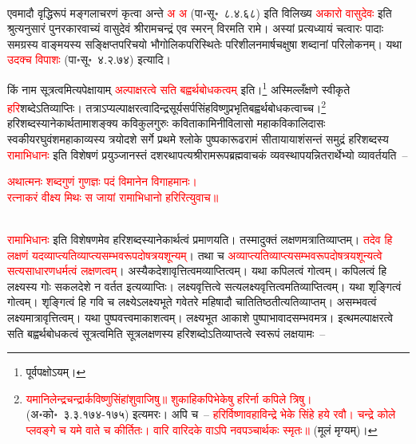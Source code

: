 \\
\begin{sloppypar}\justifying\noindent एवमादौ वृद्धिरूपं मङ्गलाचरणं कृत्वा अन्ते \textcolor{red}{अ अ} (पा॰सू॰~८.४.६८) इति विलिख्य \textcolor{red}{अकारो वासुदेवः} इति श्रुत्यनुसारं पुनरकार\-वाच्यं वासुदेवं श्रीरामचन्द्रं एव स्मरन् विरमति रामे। अस्यां प्रत्यध्यायं चत्वारः पादाः समग्रस्य वाङ्मयस्य सङ्क्षिप्त\-परिचयो भौगोलिक\-परिस्थितेः परिशीलनमार्ष\-चक्षुषा शब्दानां परिलोकनम्। यथा \textcolor{red}{उदक्च विपाशः} (पा॰सू॰~४.२.७४) इत्यादि।\end{sloppypar}
\begin{sloppypar}\justifying\noindent\hspace{10mm} किं नाम सूत्रत्वमित्यपेक्षायाम् \textcolor{red}{अल्पाक्षरत्वे सति बह्वर्थ\-बोधकत्वम्} इति।\footnote{पूर्वपक्षोऽयम्।} अस्मिल्लँक्षणे स्वीकृते \textcolor{red}{हरि}\-शब्देऽति\-व्याप्तिः। तत्राऽप्यल्पाक्षर\-त्वादिन्द्र\-सूर्य\-सर्प\-सिंह\-विष्णु\-प्रभृति\-बह्वर्थ\-बोधकत्वाच्च।\footnote{\textcolor{red}{यमानिलेन्द्र\-चन्द्रार्क\-विष्णु\-सिंहांशु\-वाजिषु॥ शुकाहि\-कपि\-भेकेषु हरिर्ना कपिले त्रिषु।} (अ॰को॰~३.३.१७४-१७५) इत्यमरः। अपि च~– \textcolor{red}{हरिर्विष्णावहाविन्द्रे भेके सिंहे हये रवौ। चन्द्रे कोले प्लवङ्गे च यमे वाते च कीर्तितः। वारि वारिदके वाऽपि नवपञ्चार्थकः स्मृतः॥} (मूलं मृग्यम्)।} हरि\-शब्दस्यानेकार्थ\-तामाशङ्क्य कवि\-कुल\-गुरुः कविता\-कामिनी\-विलासो महा\-कवि\-कालिदासः स्वकीय\-रघुवंश\-महा\-काव्यस्य त्रयोदशे सर्गे प्रथमे श्लोके पुष्पकारूढ\-रामं सीतायायाशंसन्तं समुद्रं हरि\-शब्दस्य \textcolor{red}{रामाभिधानः} इति विशेषणं प्रयुञ्जानस्तं दशरथापत्य\-श्रीराम\-रूप\-ब्रह्म\-वाचकं व्यवस्थापयन्नितरार्थेभ्यो व्यावर्तयति~–\end{sloppypar}
\centering\textcolor{red}{अथात्मनः शब्दगुणं गुणज्ञः पदं विमानेन विगाहमानः।\nopagebreak\\
रत्नाकरं वीक्ष्य मिथः स जायां रामाभिधानो हरिरित्युवाच॥}\nopagebreak\\
\\
\begin{sloppypar}\justifying\noindent \textcolor{red}{रामाभिधानः} इति विशेषणमेव हरि\-शब्दस्यानेकार्थत्वं प्रमाणयति। तस्मादुक्तं लक्षणमत्रातिव्याप्तम्। \textcolor{red}{तदेव हि लक्षणं यदव्याप्त्यति\-व्याप्त्यसम्भवरूप\-दोष\-त्रय\-शून्यम्}। तथा च  \textcolor{red}{अव्याप्त्यति\-व्याप्त्यसम्भव\-रूप\-दोष\-त्रय\-शून्यत्वे सत्यसाधारण\-धर्मत्वं लक्षणत्वम्}। अस्यैक\-देशावृत्तित्वमव्याप्तित्वम्। यथा कपिलत्वं गोत्वम्। कपिलत्वं हि लक्ष्यस्य गोः सकल\-देशे न वर्तत इत्यव्याप्तिः। लक्ष्य\-वृत्तित्वे सत्यलक्ष्य\-वृत्तित्वमतिव्याप्तित्वम्। यथा शृङ्गित्वं गोत्वम्। शृङ्गित्वं हि गवि च लक्ष्येऽलक्ष्य\-भूते गवेतरे महिषादौ चातितिष्ठतीत्यतिव्याप्तम्। असम्भवत्वं लक्ष्यमात्रावृत्तित्वम्। यथा पुष्पवत्त्वमाकाशत्वम्। लक्ष्य\-भूत आकाशे पुष्पाभावादसम्भवमत्र। इत्थमल्पाक्षरत्वे सति बह्वर्थ\-बोधकत्वं सूत्रत्वमिति सूत्र\-लक्षणस्य हरि\-शब्दोऽतिव्याप्तत्वे स्वरूपं लक्षयामः~–\end{sloppypar}
